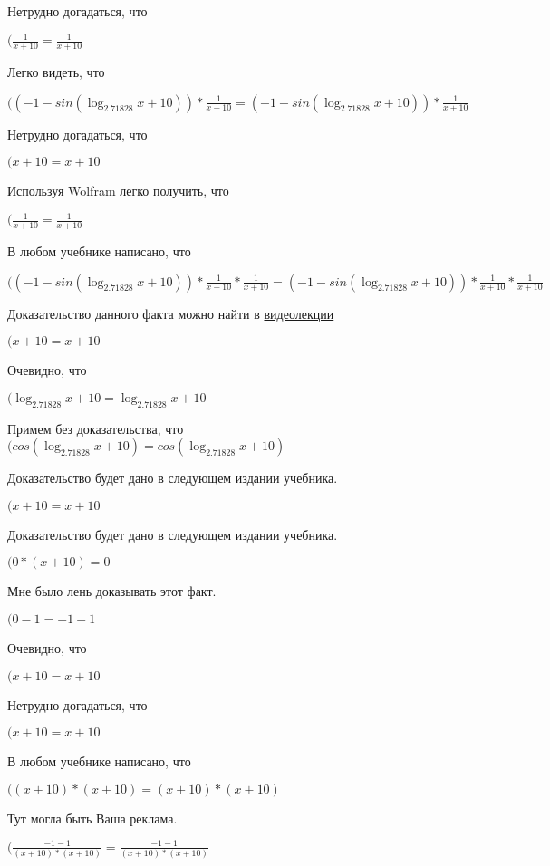 \documentclass[12pt,a4paper,fleqn]{article}
\theoremstyle{definition}
\begin{document}
Нетрудно догадаться, что

$(\frac{ 1 }{ x  +  10 }
 = \frac{ 1 }{ x  +  10 }
$

Легко видеть, что

$(( -1  - sin(\log_{ 2.71828 }{ x  +  10 })) * \frac{ 1 }{ x  +  10 }
 = ( -1  - sin(\log_{ 2.71828 }{ x  +  10 })) * \frac{ 1 }{ x  +  10 }
$

Нетрудно догадаться, что

$( x  +  10  =  x  +  10 $

Используя Wolfram легко получить, что

$(\frac{ 1 }{ x  +  10 }
 = \frac{ 1 }{ x  +  10 }
$

В любом учебнике написано, что

$(( -1  - sin(\log_{ 2.71828 }{ x  +  10 })) * \frac{ 1 }{ x  +  10 }
 * \frac{ 1 }{ x  +  10 }
 = ( -1  - sin(\log_{ 2.71828 }{ x  +  10 })) * \frac{ 1 }{ x  +  10 }
 * \frac{ 1 }{ x  +  10 }
$

Доказательство данного факта можно найти в \href{https://www.youtube.com/watch?v=dQw4w9WgXcQ}{видеолекции}

$( x  +  10  =  x  +  10 $

Очевидно, что

$(\log_{ 2.71828 }{ x  +  10 } = \log_{ 2.71828 }{ x  +  10 }$

Примем без доказательства, что
$(cos(\log_{ 2.71828 }{ x  +  10 }) = cos(\log_{ 2.71828 }{ x  +  10 })$

Доказательство будет дано в следующем издании учебника.

$( x  +  10  =  x  +  10 $

Доказательство будет дано в следующем издании учебника.

$( 0  * ( x  +  10 ) =  0 $

Мне было лень доказывать этот факт.

$( 0  -  1  =  -1  -  1 $

Очевидно, что

$( x  +  10  =  x  +  10 $

Нетрудно догадаться, что

$( x  +  10  =  x  +  10 $

В любом учебнике написано, что

$(( x  +  10 ) * ( x  +  10 ) = ( x  +  10 ) * ( x  +  10 )$

Тут могла быть Ваша реклама.

$(\frac{ -1  -  1 }{( x  +  10 ) * ( x  +  10 )}
 = \frac{ -1  -  1 }{( x  +  10 ) * ( x  +  10 )}
$
\end{document}

